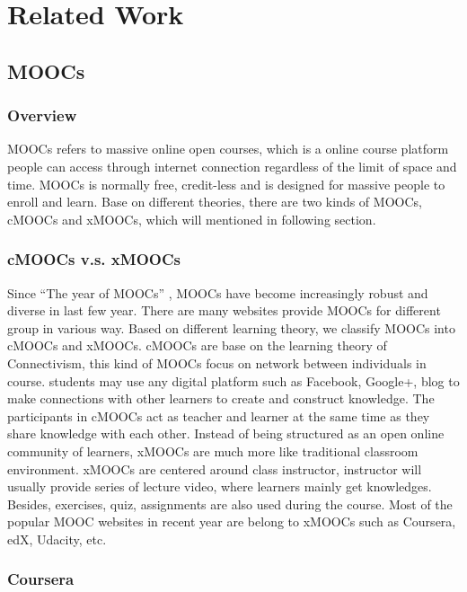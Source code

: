 \chapter{Related Work}\label{cha:Related}

\section{MOOCs}

\subsection{Overview}
MOOCs refers to massive online open courses, which is a online course platform people can access through internet connection regardless of the limit of space and time.
MOOCs is normally free, credit-less and is designed for massive people to enroll and learn.
Base on different theories, there are two kinds of MOOCs, cMOOCs and xMOOCs, which will mentioned in following section.

\subsection{cMOOCs v.s. xMOOCs}
Since ``The year of MOOCs'' \cite{pappano2012}, MOOCs have become increasingly robust and diverse in last few year.
There are many websites provide MOOCs for different group in various way.
Based on different learning theory, we classify MOOCs into cMOOCs and xMOOCs.
cMOOCs are base on the learning theory of Connectivism, this kind of MOOCs focus on network between individuals in course.
students may use any digital platform such as Facebook, Google+, blog to make connections with other learners to create and construct knowledge.
The participants in cMOOCs act as teacher and learner at the same time as they share knowledge with each other.
Instead of being structured as an open online community of learners, xMOOCs are much more like traditional classroom environment.
xMOOCs are centered around class instructor, instructor will usually provide series of lecture video, where learners mainly get knowledges.
Besides, exercises, quiz, assignments are also used during the course.
Most of the popular MOOC websites in recent year are belong to xMOOCs such as Coursera, edX, Udacity, etc.

\subsection{Coursera}

